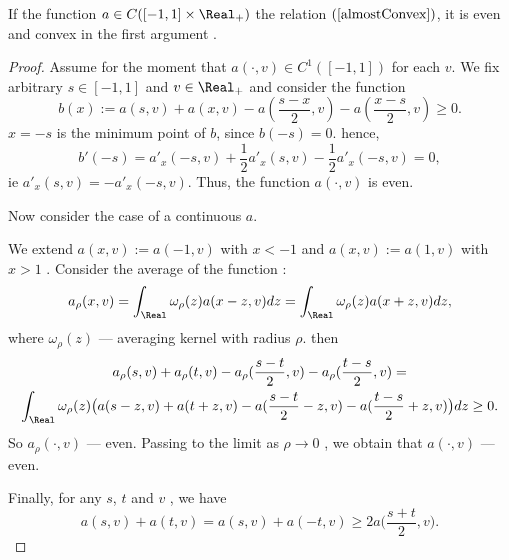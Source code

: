 \begin{lm}
If the function $a \in C([-1, 1] \times \Real_+)$ the relation $(\ref{almostConvex})$,
it is even and convex in the first argument .
\end{lm}

\begin{proof}
Assume for the moment that $a(\cdot, v) \in C^1([-1, 1])$ for each $v$.
We fix arbitrary $s \in [-1, 1]$ and $v \in \Real_+$ and consider the function
$$b(x) := a( s, v ) + a( x, v ) - a( \frac{ s - x }{2}, v ) - a( \frac{ x - s }{2}, v ) \ge 0.$$
$x = -s$ is the minimum point of $b$, since $b(-s) = 0$.
hence,
$$b'(-s) = a'_x( -s, v ) + \frac{1}{2} a'_x( s, v ) - \frac{1}{2} a'_x( -s, v ) = 0,$$
ie $a'_x( s, v ) = -a'_x( -s, v )$. Thus, the function $a(\cdot, v)$ is even.

Now consider the case of a continuous $a$.

We extend $a( x, v ) := a( -1, v )$ with $x < -1$ and $a( x, v ) := a( 1, v )$ with $x > 1$ .
Consider the average of the function :
$$a_\rho( x, v ) = \int_\Real \omega_\rho ( z ) a( x - z, v ) dz = \int_\Real \omega_\rho ( z ) a( x + z, v ) dz,$$
where $\omega_\rho(z)$ --- averaging kernel with radius $\rho$.
then
\begin{multline*}
a_\rho( s, v ) + a_\rho( t, v ) - a_\rho( \frac{ s - t }{2}, v ) - a_\rho( \frac{ t - s }{2}, v ) =
\\ \int_\Real \omega_\rho ( z ) \big( a( s - z, v ) + a( t + z, v ) - a( \frac{ s - t }{2} - z, v ) - a( \frac{ t - s }{2} + z, v ) \big) dz \ge 0.
\end{multline*}
So $a_\rho(\cdot, v)$ --- even.
Passing to the limit as $\rho \to 0$ , we obtain that $a(\cdot, v)$ --- even.

Finally, for any $s$, $t$ and $v$ , we have
$$a( s, v ) + a( t, v ) = a( s, v ) + a( -t, v ) \ge 2 a\big( \frac{ s + t }{2}, v \big).$$
\end{proof}

